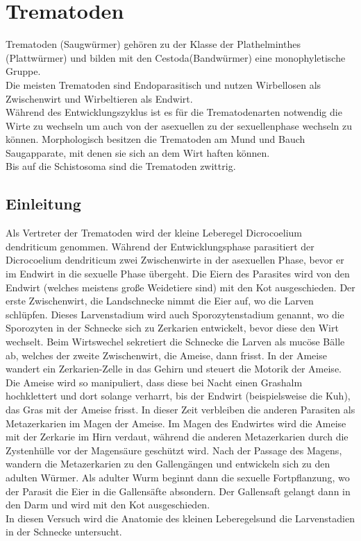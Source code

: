 \documentclass[oneside,10pt,a4paper]{report}
\begin{document}
	
	
	\chapter{Trematoden}
		Trematoden (Saugwürmer) gehören zu der Klasse der Plathelminthes (Plattwürmer) und bilden mit den Cestoda(Bandwürmer) eine monophyletische Gruppe.\\
		Die meisten Trematoden sind Endoparasitisch und nutzen Wirbellosen als Zwischenwirt und Wirbeltieren als Endwirt.\\
		Während des Entwicklungszyklus ist es für die Trematodenarten notwendig die Wirte zu wechseln um auch von der asexuellen zu der sexuellenphase wechseln zu können.
		Morphologisch besitzen die Trematoden am Mund und Bauch Saugapparate, mit denen sie sich an dem Wirt haften können. \\
		Bis auf die Schistosoma sind die Trematoden zwittrig.
		
		\section{Einleitung}
			Als Vertreter der Trematoden wird der kleine Leberegel Dicrocoelium dendriticum genommen.
			Während der Entwicklungsphase parasitiert der Dicrocoelium dendriticum zwei Zwischenwirte in der asexuellen Phase, bevor er im Endwirt in die sexuelle Phase übergeht.
			Die Eiern des Parasites wird von den Endwirt (welches meistens große Weidetiere sind) mit den Kot ausgeschieden. Der erste Zwischenwirt, die Landschnecke nimmt die Eier auf, wo die Larven schlüpfen. Dieses Larvenstadium wird auch Sporozytenstadium genannt, wo die Sporozyten in der Schnecke sich zu Zerkarien entwickelt, bevor diese den Wirt wechselt. Beim Wirtswechel sekretiert die Schnecke die Larven als mucöse Bälle ab, welches der zweite Zwischenwirt, die Ameise, dann frisst. In der Ameise wandert ein Zerkarien-Zelle in das Gehirn und steuert die Motorik der Ameise.
			Die Ameise wird so manipuliert, dass diese bei Nacht einen Grashalm hochklettert und dort solange verharrt, bis der Endwirt (beispielsweise die Kuh), das Gras mit der Ameise frisst.
			In dieser Zeit verbleiben die anderen Parasiten als Metazerkarien im Magen der Ameise.
			Im Magen des Endwirtes wird die Ameise mit der Zerkarie im Hirn verdaut, während die anderen Metazerkarien durch die Zystenhülle vor der Magensäure geschützt wird.
			Nach der Passage des Magens, wandern die Metazerkarien zu den Gallengängen und entwickeln sich zu den adulten Würmer.
			Als adulter Wurm beginnt dann die sexuelle Fortpflanzung, wo der Parasit die Eier in die Gallensäfte absondern. Der Gallensaft gelangt dann in den Darm und wird mit den Kot ausgeschieden.\\
			In diesen Versuch wird die Anatomie des kleinen Leberegelsund die Larvenstadien in der Schnecke untersucht.
			
\end{document}
